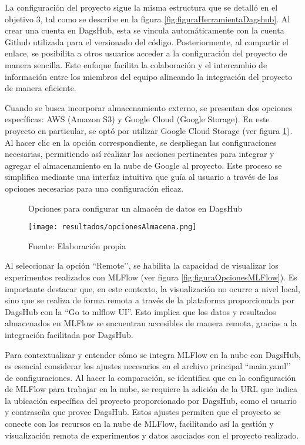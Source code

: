 La configuración del proyecto sigue la misma estructura que se detalló en el objetivo 3, tal como se describe en la figura \ref{fig:figuraHerramientaDagshub}. Al crear una cuenta en DagsHub, esta se vincula automáticamente con la cuenta Github utilizada para el versionado del código. Posteriormente, al compartir el enlace, se posibilita a otros usuarios acceder a la configuración del proyecto de manera sencilla. Este enfoque facilita la colaboración y el intercambio de información entre los miembros del equipo alineando la integración del proyecto de manera eficiente.

Cuando se busca incorporar almacenamiento externo, se presentan dos opciones específicas: AWS (Amazon S3) y Google Cloud (Google Storage). En este proyecto en particular, se optó por utilizar Google Cloud Storage (ver figura \ref{fig:figuraOpcionesAlmacena}). Al hacer clic en la opción correspondiente, se despliegan las configuraciones necesarias, permitiendo así realizar las acciones pertinentes para integrar y agregar el almacenamiento en la nube de Google al proyecto. Este proceso se simplifica mediante una interfaz intuitiva que guía al usuario a través de las opciones necesarias para una configuración eficaz.

\newpage

\begin{figure}[h]
\centering
\caption{Opciones para configurar un almacén de datos en DagsHub}
\texttt{[image: resultados/opcionesAlmacena.png]}
\caption*{\footnotesize Fuente: Elaboración propia}
\label{fig:figuraOpcionesAlmacena}
\end{figure}

Al seleccionar la opción ``Remote’’, se habilita la capacidad de visualizar los experimentos realizados con MLFlow (ver figura \ref{fig:figuraOpcionesMLFlow}). Es importante destacar que, en este contexto, la visualización no ocurre a nivel local, sino que se realiza de forma remota a través de la plataforma proporcionada por DagsHub con la “Go to mlflow UI”. Esto implica que los datos y resultados almacenados en MLFlow se encuentran accesibles de manera remota, gracias a la integración facilitada por DagsHub.

Para contextualizar y entender cómo se integra MLFlow en la nube con DagsHub, es esencial considerar los ajustes necesarios en el archivo principal ``main.yaml’’ de configuraciones. Al hacer la comparación, se identifica que en la configuración de MLFlow para trabajar en la nube, se requiere la adición de la URL que indica la ubicación específica del proyecto proporcionado por DagsHub, como el usuario y contraseña que provee DagsHub. Estos ajustes permiten que el proyecto se conecte con los recursos en la nube de MLFlow, facilitando así la gestión y visualización remota de experimentos y datos asociados con el proyecto realizado.

